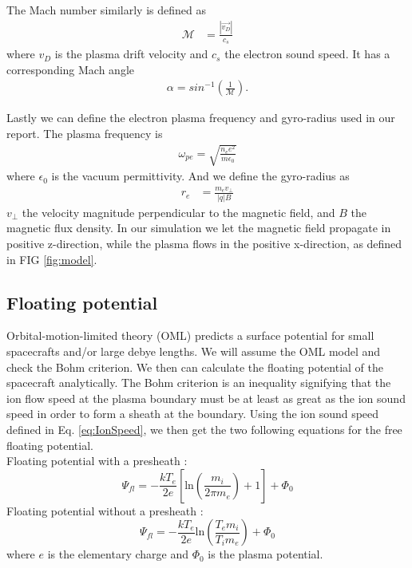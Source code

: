 \documentclass[aip, 
rsi, 
amsmath,
amssymb,
longbibliography,
reprint]{revtex4-1}
\begin{document}
The Mach number similarly is defined as
\begin{align}
\mathcal{M} &= \frac{|\vec{v_D}|}{c_s}\label{eq:Mach}
\end{align}
where $v_D$ is the plasma drift velocity and $c_s$ the electron sound speed. It has a corresponding Mach angle
\begin{align}
\alpha = sin^{-1}(\frac{1}{\mathcal{M}})\label{eq:MachAngle}.
\end{align}

Lastly we can define the electron plasma frequency and gyro-radius used in our report. The plasma frequency is
\begin{align}
\omega_{pe} = \sqrt{\frac{n_e e^2}{m \epsilon_0}}\label{plasmafreq}
\end{align}
where $\epsilon_0$ is the vacuum permittivity. And we define the gyro-radius as 
\begin{align}
r_e &= \frac{m_e v_\perp}{|q| B}\label{eq:gyroradius}
\end{align}
$v_\perp$ the velocity magnitude perpendicular to the magnetic field, and $B$ the magnetic flux density. In our simulation we let the magnetic field propagate in positive z-direction, while the plasma flows in the positive x-direction, as defined in FIG \ref{fig:model}.

\subsection{Floating potential}

Orbital-motion-limited theory (OML) predicts a surface potential for small spacecrafts and/or large debye lengths. We will assume the OML model and check the Bohm criterion. We then can calculate the floating potential of the spacecraft analytically. The Bohm criterion is an inequality signifying that the ion flow speed at the plasma boundary must be at least as great as the ion sound speed in order to form a sheath at the boundary.  Using the ion sound speed defined in Eq. \ref{eq:IonSpeed}, we then get the two following equations for the free floating potential. \\

Floating potential with a presheath \cite{Boef}:
\begin{equation}\label{eq:Boef}
\Psi_{fl} = -\frac{k T_e}{2e}[\text{ln}(\frac{m_i}{2\pi m_e})+1]+\Phi_0
\end{equation}
Floating potential without a presheath \cite{Pesceli}:
\begin{equation}\label{eq:Pesceli}
\Psi_{fl}=-\frac{k T_e}{2e}\text{ln}(\frac{T_em_i}{T_i m_e})+\Phi_0
\end{equation}
where $e$ is the elementary charge and $\Phi_0$ is the plasma potential. \\
\end{document}
